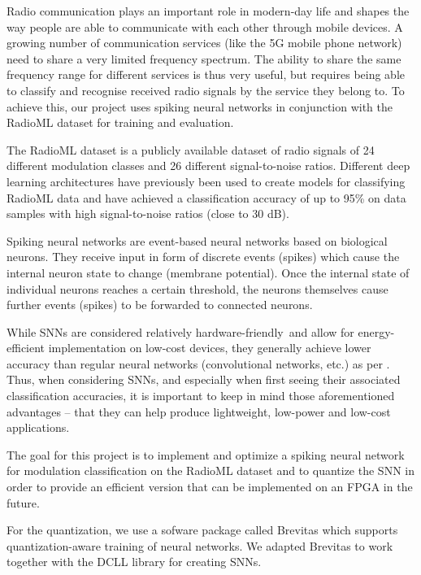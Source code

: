 \documentclass[parskip=true, 10pt]{scrartcl}
\begin{document}
Radio communication plays an important role in modern-day life and shapes the way people are able to communicate with each other through mobile devices. A growing number of communication services (like the 5G mobile phone network) need to share a very limited frequency spectrum. The ability to share the same frequency range for different services is thus very useful, but requires being able to classify and recognise received radio signals by the service they belong to. To achieve this, our project uses spiking neural networks in conjunction with the RadioML dataset for training and evaluation.

The RadioML dataset \cite{radioml-dataset} is a publicly available dataset of radio signals of 24 different modulation classes and 26 different signal-to-noise ratios. Different deep learning architectures have previously been used to create models for classifying RadioML data \cite{previouswork} and have achieved a classification accuracy of up to 95\% on data samples with high signal-to-noise ratios (close to 30 dB).

Spiking neural networks are event-based neural networks based on biological neurons. They receive input in form of discrete events (spikes) which cause the internal neuron state to change (membrane potential). Once the internal state of individual neurons reaches a certain threshold, the neurons themselves cause further events (spikes) to be forwarded to connected neurons.

While SNNs are considered relatively \lqq hardware-friendly\rqq\ and allow for energy-efficient implementation on low-cost devices, they generally achieve lower accuracy than regular neural networks (convolutional networks, etc.) as per \cite{snn-survey}. Thus, when considering SNNs, and especially when first seeing their associated classification accuracies, it is important to keep in mind those aforementioned advantages -- that they can help produce lightweight, low-power and low-cost applications.

The goal for this project is to implement and optimize a spiking neural network for modulation classification on the RadioML dataset and to quantize the SNN in order to provide an efficient version that can be implemented on an FPGA in the future.

For the quantization, we use a sofware package called Brevitas which supports quantization-aware training of neural networks. We adapted Brevitas to work together with the DCLL library for creating SNNs.
\end{document}
